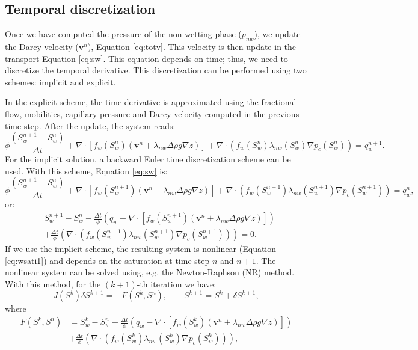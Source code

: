 \documentclass[12pt]{article}
\begin{document}
\subsection*{Temporal discretization}
\hspace{0.5cm}Once we have computed the pressure of the non-wetting phase ($p_{nw}$), we update the Darcy velocity 
($\mathbf{v}^n$), Equation \eqref{eq:totv}. This velocity is then update in the transport Equation \eqref{eq:sw}. 
This equation depends on time; thus, we need to discretize the temporal derivative. This discretization can be performed 
using two schemes: implicit and explicit. \par In the explicit scheme, the time derivative is approximated using the fractional 
flow, mobilities, capillary pressure and Darcy velocity computed in the previous time step. After the update, the system reads:
\begin{equation}\label{eq:wsate}
 \phi\frac{( {S}_{w}^{n+1}-{S}_{w}^n)}{\Delta t}+\nabla \cdot [f_w({S}_{w}^n)( \mathbf{v}^n+\lambda_{nw}\Delta  \rho g\nabla z)]+\nabla \cdot(f_w({S}_{w}^n)\lambda_{nw}({S}_{w}^n)\nabla p_c({S}_{w}^n))= q_w^{n+1}.
\end{equation}
For the implicit solution, a backward Euler time discretization scheme can be used. With this scheme, Equation \eqref{eq:sw} is:
\begin{equation}\label{eq:wsati}
 \phi\frac{( {S}_{w}^{n+1}-{S}_{w}^n)}{\Delta t}+\nabla \cdot [f_w({S}_{w}^{n+1})( \mathbf{v}^n+\lambda_{nw}\Delta  \rho g\nabla z)]+\nabla \cdot(f_w({S}_{w}^{n+1})\lambda_{nw}({S}_{w}^{n+1})\nabla p_c({S}_{w}^{n+1}))= q_w^n,
\end{equation}
or:
\begin{align}\label{eq:wsati1}
 &{S}_{w}^{n+1}-{S}_{w}^n-\frac{\Delta t}{\phi}\left(q_w-\nabla \cdot [f_w({S}_{w}^{n+1})( \mathbf{v}^n+\lambda_{nw}\Delta  \rho g\nabla z)]\right)\nonumber \\ 
 &+\frac{\Delta t}{\phi}\left(\nabla\cdot(f_w({S}_{w}^{n+1})\lambda_{nw}({S}_{w}^{n+1})\nabla p_c({S}_{w}^{n+1}))\right)=0.
\end{align}
 If we use the implicit scheme, the resulting system is nonlinear (Equation \eqref{eq:wsati1}) and depends on the saturation at 
 time step $n$ and $n+1$. The nonlinear system can be solved using, e.g. the Newton-Raphson (NR) method. With this method, 
 for the $(k+1)$-th iteration we have:
$${J}({S}^k)\delta{S}^{k+1}=-{F}({S}^k,{S}^n),
\qquad {S}^{k+1}={S}^k+\delta {S}^{k+1},$$
where
\begin{align}\label{eq:wsati2}
 {F}({S}^k,{S}^n)&={S}_{w}^{k}-{S}_{w}^n-\frac{\Delta t}{\phi}\left(q_w-\nabla \cdot [f_w({S}_{w}^{k})( \mathbf{v}^n+\lambda_{nw}\Delta  \rho g\nabla z)]\right)\nonumber \\ 
 &+\frac{\Delta t}{\phi}\left(\nabla\cdot(f_w({S}_{w}^{k})\lambda_{nw}({S}_{w}^{k})\nabla p_c({S}_{w}^{k}))\right),
\end{align}
\end{document}
